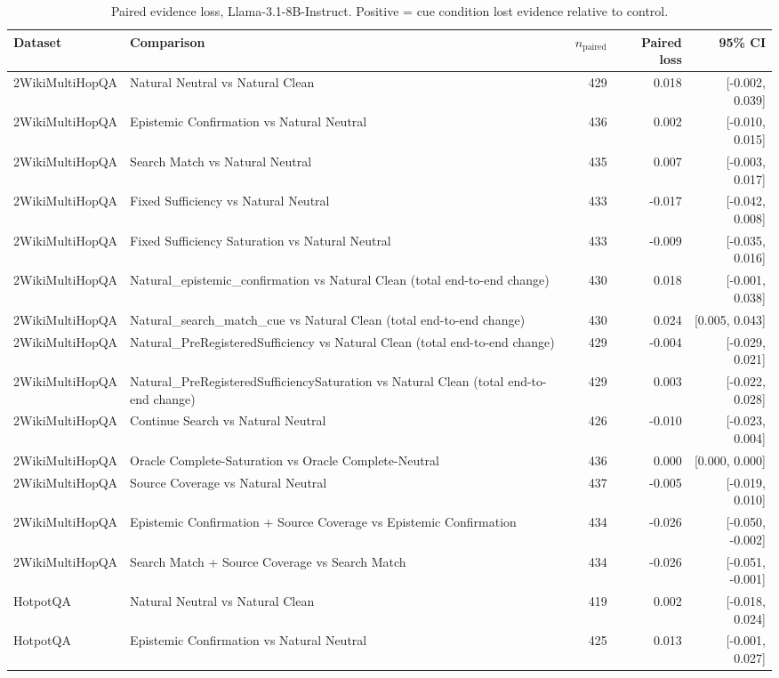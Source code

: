 \begin{table}[t]
\centering
\caption{Paired evidence loss, Llama-3.1-8B-Instruct. Positive = cue condition lost evidence relative to control.}
\begin{tabular}{llrrr}
\toprule
Dataset & Comparison & $n_{\text{paired}}$ & Paired loss & 95\% CI \\
\midrule
2WikiMultiHopQA & Natural Neutral vs Natural Clean & 429 & 0.018 & [-0.002, 0.039] \\
2WikiMultiHopQA & Epistemic Confirmation vs Natural Neutral & 436 & 0.002 & [-0.010, 0.015] \\
2WikiMultiHopQA & Search Match vs Natural Neutral & 435 & 0.007 & [-0.003, 0.017] \\
2WikiMultiHopQA & Fixed Sufficiency vs Natural Neutral & 433 & -0.017 & [-0.042, 0.008] \\
2WikiMultiHopQA & Fixed Sufficiency Saturation vs Natural Neutral & 433 & -0.009 & [-0.035, 0.016] \\
2WikiMultiHopQA & Natural\_epistemic\_confirmation vs Natural Clean (total end-to-end change) & 430 & 0.018 & [-0.001, 0.038] \\
2WikiMultiHopQA & Natural\_search\_match\_cue vs Natural Clean (total end-to-end change) & 430 & 0.024 & [0.005, 0.043] \\
2WikiMultiHopQA & Natural\_PreRegisteredSufficiency vs Natural Clean (total end-to-end change) & 429 & -0.004 & [-0.029, 0.021] \\
2WikiMultiHopQA & Natural\_PreRegisteredSufficiencySaturation vs Natural Clean (total end-to-end change) & 429 & 0.003 & [-0.022, 0.028] \\
2WikiMultiHopQA & Continue Search vs Natural Neutral & 426 & -0.010 & [-0.023, 0.004] \\
2WikiMultiHopQA & Oracle Complete-Saturation vs Oracle Complete-Neutral & 436 & 0.000 & [0.000, 0.000] \\
2WikiMultiHopQA & Source Coverage vs Natural Neutral & 437 & -0.005 & [-0.019, 0.010] \\
2WikiMultiHopQA & Epistemic Confirmation + Source Coverage vs Epistemic Confirmation & 434 & -0.026 & [-0.050, -0.002] \\
2WikiMultiHopQA & Search Match + Source Coverage vs Search Match & 434 & -0.026 & [-0.051, -0.001] \\
HotpotQA & Natural Neutral vs Natural Clean & 419 & 0.002 & [-0.018, 0.024] \\
HotpotQA & Epistemic Confirmation vs Natural Neutral & 425 & 0.013 & [-0.001, 0.027] \\

\end{tabular}
\end{table}
